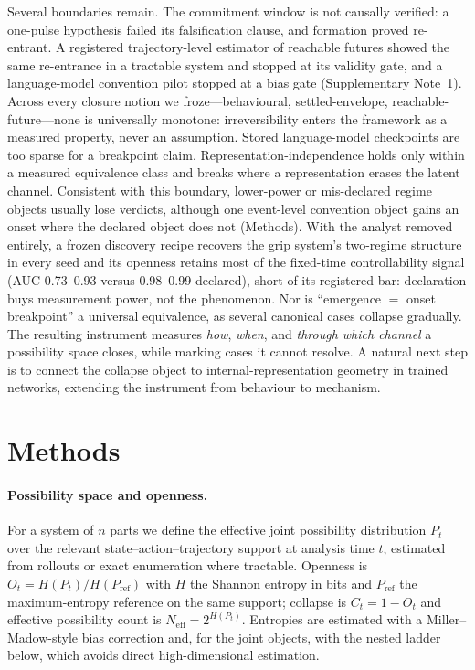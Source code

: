 \documentclass[11pt]{article}
\begin{document}
Several boundaries remain. The commitment window is not causally
verified: a one-pulse hypothesis failed its falsification clause, and
formation proved re-entrant. A registered trajectory-level estimator
of reachable futures showed the same re-entrance in a tractable system
and stopped at its validity gate, and a language-model convention
pilot stopped at a bias gate (Supplementary Note~1). Across every
closure notion we froze---behavioural, settled-envelope,
reachable-future---none is universally monotone: irreversibility
enters the framework as a measured property, never an assumption.
Stored language-model checkpoints are too
sparse for a breakpoint claim. Representation-independence holds only
within a measured equivalence class and breaks where a representation
erases the latent channel. Consistent with this boundary, lower-power
or mis-declared regime objects usually lose verdicts, although one
event-level convention object gains an onset where the declared object
does not (Methods). With the analyst removed entirely, a frozen
discovery recipe recovers the grip system's two-regime structure in
every seed and its openness retains most of the fixed-time
controllability signal (AUC 0.73--0.93 versus 0.98--0.99 declared),
short of its registered bar: declaration buys measurement power, not
the phenomenon. Nor is ``emergence $=$ onset breakpoint'' a
universal equivalence, as several canonical cases collapse gradually.
The resulting instrument measures \emph{how}, \emph{when}, and
\emph{through which channel} a possibility space closes, while marking
cases it cannot resolve. A natural next step is to connect the collapse
object to internal-representation geometry in trained
networks\citep{shai2024transformers}, extending the instrument from
behaviour to mechanism.

\section*{Methods}

\small

\paragraph{Possibility space and openness.}
For a system of $n$ parts we define the effective joint possibility
distribution $P_t$ over the relevant state--action--trajectory support at
analysis time $t$, estimated from rollouts or exact enumeration where
tractable. Openness is $O_t=H(P_t)/H(P_\mathrm{ref})$ with $H$ the
Shannon entropy in bits and $P_\mathrm{ref}$ the maximum-entropy
reference on the same support; collapse is $C_t=1-O_t$ and effective
possibility count is $N_\mathrm{eff}=2^{H(P_t)}$. Entropies are estimated
with a Miller--Madow-style bias correction and, for the joint objects,
with the nested ladder below, which avoids direct high-dimensional
estimation.
\end{document}
